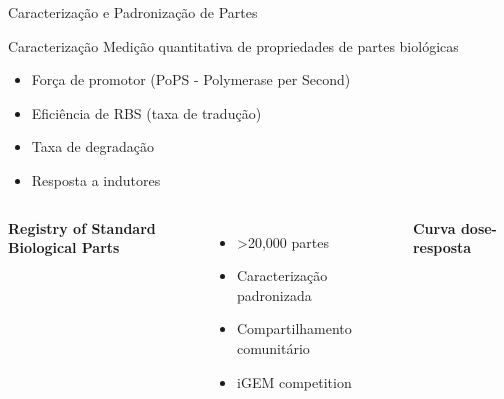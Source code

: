\begin{frame}{Caracterização e Padronização de Partes}
\begin{block}{Caracterização}
Medição quantitativa de propriedades de partes biológicas
\begin{itemize}
    \item Força de promotor (PoPS - Polymerase per Second)
    \item Eficiência de RBS (taxa de tradução)
    \item Taxa de degradação
    \item Resposta a indutores
\end{itemize}
\end{block}

\vspace{0.3cm}

\begin{columns}
\textbf{Registry of Standard Biological Parts}
\begin{itemize}
    \item \textgreater 20,000 partes
    \item Caracterização padronizada
    \item Compartilhamento comunitário
    \item iGEM competition
\end{itemize}

\begin{center}
\end{center}

\textbf{Curva dose-resposta}
\end{columns}
\end{frame}

